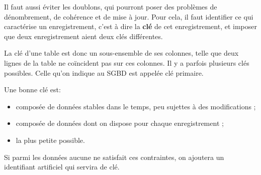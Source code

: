 \documentclass{scrartcl}
\begin{document}
		\rem Il faut aussi éviter les doublons, qui pourront poser des problèmes de dénombrement, de cohérence et de mise à jour.
		Pour cela, il faut identifier ce qui caractérise un enregistrement, c'est à dire la \textbf{clé} de cet enregistrement,
		et imposer que deux enregistrement aient deux clés différentes.

		La clé d'une table est donc un sous-ensemble de ses colonnes, telle que deux lignes de la table ne coïncident pas sur ces colonnes.
		Il y a parfois plusieurs clés possibles. Celle qu'on indique au SGBD est appelée clé primaire.

		Une bonne clé est:
		\begin{itemize}
			\item composée de données stables dans le temps, peu sujettes à des modifications ;
			\item composée de données dont on dispose pour chaque enregistrement ;
			\item la plus petite possible.
		\end{itemize}
		
		Si parmi les données aucune ne satisfait ces contraintes, on ajoutera un identifiant artificiel qui servira de clé.
	
\end{document}
